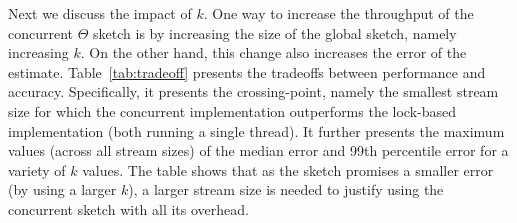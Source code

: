 Next we discuss the impact of $k$.
One way to increase the throughput of the concurrent $\Theta$ sketch is by
increasing the size of the global sketch, namely increasing $k$. On the other hand,
this change also increases the error of the estimate.
Table~\ref{tab:tradeoff} presents the tradeoffs between performance and accuracy.
Specifically, it presents the crossing-point, namely the smallest stream size for which the concurrent
implementation outperforms the lock-based implementation (both running a single thread). It further presents
the maximum values (across all stream sizes) of the median error and 99th percentile error for a variety of $k$ values.
The table shows that as the sketch promises a smaller error (by using a larger $k$), a larger stream size is needed to justify using
the concurrent sketch with all its overhead.

\begin{table}[htb]
\caption{{Performance vs accuracy as a function of $k$.}}
\label{tab:tradeoff}
\end{table}  


